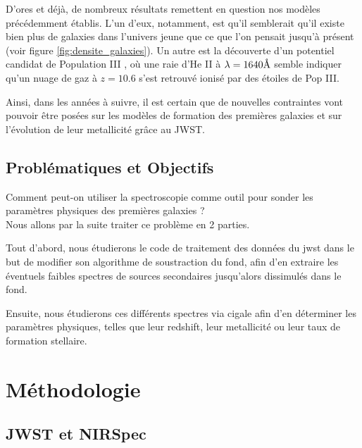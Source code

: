 \documentclass[11pt, a4paper]{article}
\begin{document}
D'ores et déjà, de nombreux résultats remettent en question nos modèles précédemment établis. L'un d'eux, notamment, est qu'il semblerait qu'il existe bien plus de galaxies dans l'univers jeune que ce que l'on pensait jusqu'à présent \cite{2023arXiv231104279F} (voir figure \ref{fig:densite_galaxies}). Un autre est la découverte d'un potentiel candidat de Population III \cite{2023arXiv230600953M}, où une raie d'He II à $\lambda = 1640 \text{\r{A}}$ semble indiquer qu'un nuage de gaz à $z = 10.6$ s'est retrouvé ionisé par des étoiles de Pop III. 

Ainsi, dans les années à suivre, il est certain que de nouvelles contraintes vont pouvoir être posées sur les modèles de formation des premières galaxies et sur l'évolution de leur metallicité grâce au JWST.

\subsection{Problématiques et Objectifs}

Comment peut-on utiliser la spectroscopie comme outil pour sonder les paramètres physiques des premières galaxies ?\\

Nous allons par la suite traiter ce problème en 2 parties.

Tout d'abord, nous étudierons le code de traitement des données du \gls{jwst} dans le but de modifier son algorithme de soustraction du fond, afin d'en extraire les éventuels faibles spectres de sources secondaires jusqu'alors dissimulés dans le fond.

Ensuite, nous étudierons ces différents spectres via \gls{cigale} afin d'en déterminer les paramètres physiques, telles que leur redshift, leur metallicité ou leur taux de formation stellaire.

\section{Méthodologie}

\subsection{JWST et NIRSpec}
\end{document}
